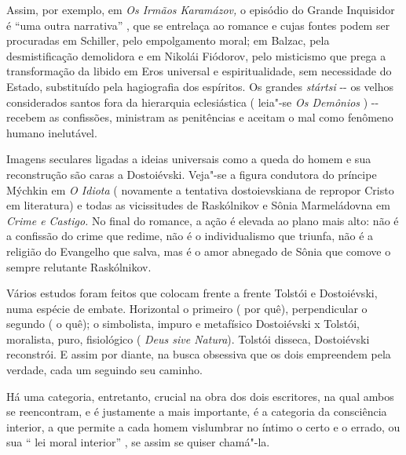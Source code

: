 Assim, por exemplo, em \emph{Os Irmãos Karamázov,} o episódio do Grande
Inquisidor é ``uma outra narrativa'' , que se entrelaça ao romance e
cujas fontes podem ser procuradas em Schiller, pelo empolgamento moral;
em Balzac, pela desmistificação demolidora e em Nikolái Fiódorov, pelo
misticismo que prega a transformação da libido em Eros universal e
espiritualidade, sem necessidade do Estado, substituído pela hagiografia
dos espíritos. Os grandes \emph{stártsi} -\/- os velhos considerados
santos fora da hierarquia eclesiástica ( leia"-se \emph{Os Demônios} )
-\/- recebem as confissões, ministram as penitências e aceitam o mal
como fenômeno humano inelutável.

Imagens seculares ligadas a ideias universais como a queda do homem e
sua reconstrução são caras a Dostoiévski. Veja"-se a figura condutora do
príncipe Mýchkin em \emph{O Idiota} ( novamente a tentativa
dostoievskiana de repropor Cristo em literatura) e todas as vicissitudes
de Raskólnikov e Sônia Marmeládovna em \emph{Crime e Castigo.} No final
do romance, a ação é elevada ao plano mais alto: não é a confissão do
crime que redime, não é o individualismo que triunfa, não é a religião
do Evangelho que salva, mas é o amor abnegado de Sônia que comove o
sempre relutante Raskólnikov.

Vários estudos foram feitos que colocam frente a frente Tolstói e
Dostoiévski, numa espécie de embate. Horizontal o primeiro ( por quê),
perpendicular o segundo ( o quê); o simbolista, impuro e metafísico
Dostoiévski x Tolstói, moralista, puro, fisiológico ( \emph{Deus sive
Natura}). Tolstói disseca, Dostoiévski reconstrói. E assim por diante,
na busca obsessiva que os dois empreendem pela verdade, cada um seguindo
seu caminho.

Há uma categoria, entretanto, crucial na obra dos dois escritores, na
qual ambos se reencontram, e é justamente a mais importante, é a
categoria da consciência interior, a que permite a cada homem vislumbrar
no íntimo o certo e o errado, ou sua `` lei moral interior'' , se assim
se quiser chamá"-la.

